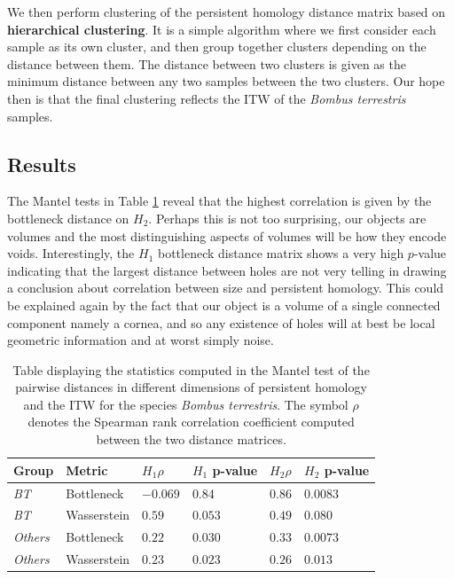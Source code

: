 We then perform clustering of the persistent homology distance matrix based on \textbf{hierarchical clustering}. It is a simple algorithm where we first consider each sample as its own cluster, and then group together clusters depending on the distance between them. The distance between two clusters is given as the minimum distance between any two samples between the two clusters. Our hope then is that the final clustering reflects the ITW of the \textit{Bombus terrestris} samples.


\subsection{Results}
The Mantel tests in Table \ref{mantelc} reveal that the highest correlation is given by the bottleneck distance on $H_{2}$. Perhaps this is not too surprising, our objects are volumes and the most distinguishing aspects of volumes will be how they encode voids. Interestingly, the $H_{1}$ bottleneck distance matrix shows a very high $p$-value indicating that the largest distance between holes are not very telling in drawing a conclusion about correlation between size and persistent homology. This could be explained again by the fact that our object is a volume of a single connected component namely a cornea, and so any existence of holes will at best be local geometric information and at worst simply noise.

\begin{table}[h]
\begin{center}

\begin{tabular}{*6l}    \toprule
Group  & Metric  & $H_{1} \rho $  & $H_{1}$ p-value  & $H_{2} \rho$ & $H_{2}$ p-value  \\ \midrule
\textit{BT} & Bottleneck & $-0.069$ & $0.84$ & $0.86$ & $0.0083$\\
\textit{BT} & Wasserstein & $0.59 $ & $0.053 $ & $0.49$ & $0.080$\\
\textit{Others}& Bottleneck & $0.22$ & $0.030$ & $0.33$ & $0.0073$\\
\textit{Others}& Wasserstein & $0.23$ & $0.023$ & $0.26$ & $0.013$\\\bottomrule
 \hline
\end{tabular}
\end{center}

\caption{\label{mantelc} Table displaying the statistics computed in the Mantel test of the pairwise distances in different dimensions of persistent homology and the ITW for the species \textit{Bombus terrestris}. The symbol $\rho$ denotes the Spearman rank correlation coefficient computed between the two distance matrices. }
\end{table}

